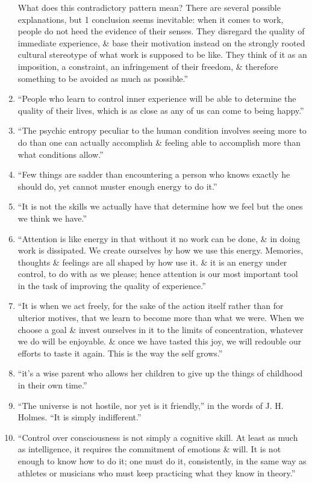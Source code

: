 \documentclass{article}
\numberwithin{equation}{section}
\begin{document}
\begin{enumerate}
	What does this contradictory pattern mean? There are several possible explanations, but 1 conclusion seems inevitable: when it comes to work, people do not heed the evidence of their senses. They disregard the quality of immediate experience, \& base their motivation instead on the strongly rooted cultural stereotype of what work is supposed to be like. They think of it as an imposition, a constraint, an infringement of their freedom, \& therefore something to be avoided as much as possible.''
	\item ``People who learn to control inner experience will be able to determine the quality of their lives, which is as close as any of us can come to being happy.''
	\item ``The psychic entropy peculiar to the human condition involves seeing more to do than one can actually accomplish \& feeling able to accomplish more than what conditions allow.''
	\item ``Few things are sadder than encountering a person who knows exactly he should do, yet cannot muster enough energy to do it.''
	\item ``It is not the skills we actually have that determine how we feel but the ones we think we have.''
	\item ``Attention is like energy in that without it no work can be done, \& in doing work is dissipated. We create ourselves by how we use this energy. Memories, thoughts \& feelings are all shaped by how use it. \& it is an energy under control, to do with as we please; hence attention is our most important tool in the task of improving the quality of experience.''
	\item ``It is when we act freely, for the sake of the action itself rather than for ulterior motives, that we learn to become more than what we were. When we choose a goal \& invest ourselves in it to the limits of concentration, whatever we do will be enjoyable. \& once we have tasted this joy, we will redouble our efforts to taste it again. This is the way the self grows.''
	\item ``it's a wise parent who allows her children to give up the things of childhood in their own time.''
	\item ``The universe is not hostile, nor yet is it friendly,'' in the words of J. H. Holmes. ``It is simply indifferent.''
	\item ``Control over consciousness is not simply a cognitive skill. At least as much as intelligence, it requires the commitment of emotions \& will. It is not enough to know how to do it; one must do it, consistently, in the same way as athletes or musicians who must keep practicing what they know in theory.''

\end{enumerate}
\end{document}
